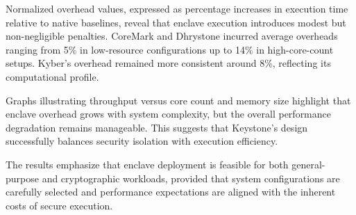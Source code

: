 Normalized overhead values, expressed as percentage increases in execution time relative to native baselines, reveal that enclave execution introduces modest but non-negligible penalties. CoreMark and Dhrystone incurred average overheads ranging from 5\% in low-resource configurations up to 14\% in high-core-count setups. Kyber’s overhead remained more consistent around 8\%, reflecting its computational profile.

Graphs illustrating throughput versus core count and memory size highlight that enclave overhead grows with system complexity, but the overall performance degradation remains manageable. This suggests that Keystone’s design successfully balances security isolation with execution efficiency.

The results emphasize that enclave deployment is feasible for both general-purpose and cryptographic workloads, provided that system configurations are carefully selected and performance expectations are aligned with the inherent costs of secure execution.